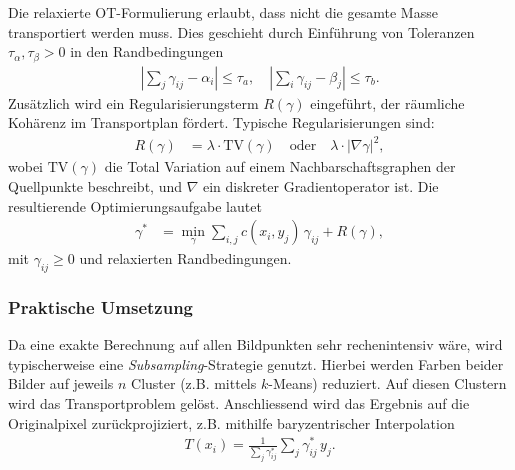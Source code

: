 Die relaxierte OT-Formulierung erlaubt,
dass nicht die gesamte Masse transportiert werden muss.
Dies geschieht durch Einführung von Toleranzen $\tau_\alpha, \tau_\beta > 0$
in den Randbedingungen
\begin{align*}
\left| \sum_{j} \gamma_{ij} - \alpha_i \right|
\leq
\tau_a
, \quad
\left| \sum_{i} \gamma_{ij} - \beta_j \right|
\leq
\tau_b.
\end{align*}
Zusätzlich wird ein Regularisierungsterm $R(\gamma)$ eingeführt,
der räumliche Kohärenz im Transportplan fördert.
Typische Regularisierungen sind:
\begin{align*}
R(\gamma)
&=
\lambda \cdot \mathrm{TV}(\gamma)
\quad \text{oder} \quad
\lambda \cdot |\nabla \gamma|^2,
\end{align*}
wobei $\mathrm{TV}(\gamma)$ die Total Variation
auf einem Nachbarschaftsgraphen der Quellpunkte beschreibt,
und $\nabla$ ein diskreter Gradientoperator ist.
Die resultierende Optimierungsaufgabe lautet
\begin{align*}
\gamma^\ast
&=
\min_{\gamma} \sum_{i,j} c(x_i, y_j)\, \gamma_{ij} + R(\gamma),
\end{align*}
mit $\gamma_{ij} \geq 0$ und relaxierten Randbedingungen.

\subsubsection{Praktische Umsetzung}
Da eine exakte Berechnung auf allen Bildpunkten sehr rechenintensiv wäre,
wird typischerweise eine \emph{Subsampling}-Strategie genutzt.
Hierbei werden Farben beider Bilder auf jeweils $n$ Cluster
(z.B. mittels $k$-Means) reduziert.
Auf diesen Clustern wird das Transportproblem gelöst.
Anschliessend wird das Ergebnis auf die Originalpixel zurückprojiziert,
z.B. mithilfe baryzentrischer Interpolation
\begin{align*}
T(x_i)
=
\frac{1}{\sum_j \gamma^\ast_{ij}} \sum_j \gamma^\ast_{ij} \, y_j.
\end{align*}

